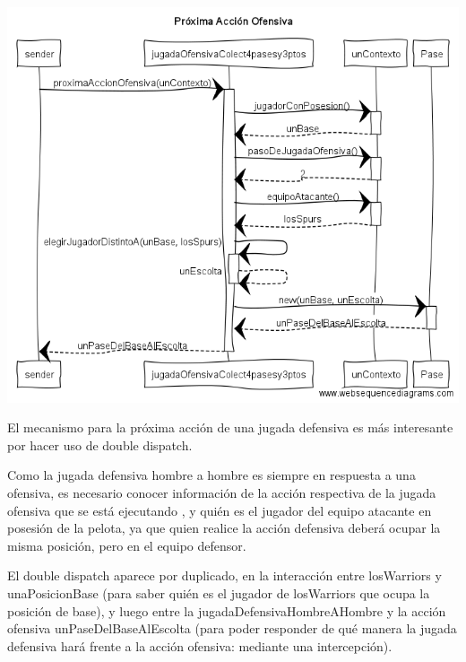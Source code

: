 \begin{center}
\includegraphics[scale=0.4]{diseno/Proxima_accion_ofensiva.png}
\end{center}

El mecanismo para la próxima acción de una jugada defensiva es más interesante por hacer uso de double dispatch.

Como la jugada defensiva hombre a hombre es siempre en respuesta a una ofensiva, es necesario conocer información de la acción respectiva de la jugada ofensiva que se está ejecutando , y quién es el jugador del equipo atacante en posesión de la pelota, ya que quien realice la acción defensiva deberá ocupar la misma posición, pero en el equipo defensor.

El double dispatch aparece por duplicado, en la interacción entre losWarriors y unaPosicionBase (para saber quién es el jugador de losWarriors que ocupa la posición de base), y luego entre la jugadaDefensivaHombreAHombre y la acción ofensiva unPaseDelBaseAlEscolta (para poder responder de qué manera la jugada defensiva hará frente a la acción ofensiva: mediante una intercepción).

